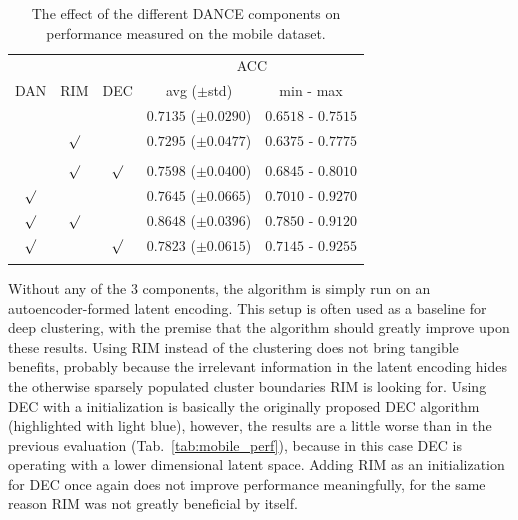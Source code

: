			\begin{table}[ht]
				\centering
				\renewcommand{\arraystretch}{1.25}
				\setlength\tabcolsep{4pt}
				\begin{tabular}{c|c|c|c|c}
					\multicolumn{3}{c|}{}       & \multicolumn{2}{c}{ACC} \\
					\cline{4-5}
					\ac{DAN}        & \ac{RIM}        & \ac{DEC}        & avg ($\pm$std)                 & min - max  \\
					\hline
					&                 &                 & $0.7135$ ($\pm0.0290$)         & $0.6518$ - $0.7515$ \\
					& $\surd$         &                 & $0.7295$ ($\pm0.0477$)         & $0.6375$ - $0.7775$ \\
					\hlone{}        & \hlone{}        & \hlone{$\surd$} & \hlone{$0.7475$ ($\pm0.0391$)} & \hlone{$0.6720$ - $0.7985$} \\
					& $\surd$         & $\surd$         & $0.7598$ ($\pm0.0400$)         & $0.6845$ - $0.8010$ \\
					\hline        
					$\surd$         &                 &                 & $0.7645$ ($\pm0.0665$)         & $0.7010$ - $0.9270$ \\
					$\surd$         & $\surd$         &                 & $0.8648$ ($\pm0.0396$)         & $0.7850$ - $0.9120$ \\
					$\surd$         &                 & $\surd$         & $0.7823$ ($\pm0.0615$)         & $0.7145$ - $0.9255$ \\
					\hltwo{$\surd$} & \hltwo{$\surd$} & \hltwo{$\surd$} & \hltwo{$0.8923$ ($\pm0.0410$)} & \hltwo{$0.8125$ - $0.9305$} \\
				\end{tabular}
				\caption[DANCE ablation study]{The effect of the different DANCE components on performance measured on the mobile dataset.}
				\label{tab:ablation_perf}
			\end{table}
			
			Without any of the $3$ components, the algorithm is simply \kmeans{} run on an autoencoder-formed latent encoding.
			This setup is often used as a baseline for deep clustering, with the premise that the algorithm should greatly improve upon these results.
			Using \ac{RIM} instead of the \kmeans{} clustering does not bring tangible benefits, probably because the irrelevant information in the latent encoding hides the otherwise sparsely populated cluster boundaries \ac{RIM} is looking for.
			Using \ac{DEC} with a \kmeans{} initialization is basically the originally proposed \ac{DEC} algorithm (highlighted with light blue), however, the results are a little worse than in the previous evaluation (Tab.~\ref{tab:mobile_perf}), because in this case \ac{DEC} is operating with a lower dimensional latent space.
			Adding \ac{RIM} as an initialization for \ac{DEC} once again does not improve performance meaningfully, for the same reason \ac{RIM} was not greatly beneficial by itself.
			
